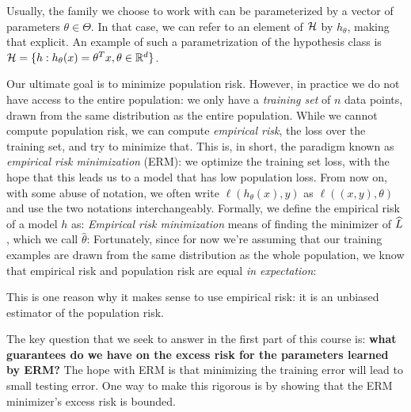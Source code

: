 Usually, the family we choose to work with can be parameterized by a vector of parameters $\theta \in \Theta$. In that case, we can refer to an element of $\mathcal H$ by $h_\theta$, making that explicit. An example of such a parametrization of the hypothesis class is $\mathcal H = \{ h: h_\theta(x) = \theta^Tx, \theta \in \mathbb{R}^d \}$.


Our ultimate goal is to minimize population risk. However, in practice we do not have access to the entire population: we only have a \emph{training set} of $n$ data points, drawn from the same distribution as the entire population. While we cannot compute population risk, we can compute \emph{empirical risk}, the loss over the training set, and try to minimize that. This is, in short, the paradigm known as \emph{empirical risk minimization} (ERM): we optimize the training set loss, with the hope that this leads us to a model that has low
population loss. From now on, with some abuse of notation, we often write $\ell(h_\theta(x),y)$ as $\ell((x,y),\theta)$ and use the two notations interchangeably.  Formally, we define the empirical risk of a model $h$ as:
\emph{Empirical risk minimization} means of finding the minimizer of $\widehat{L}$, which we call $\hat{\theta}$:
Fortunately, since for now we're assuming that our training examples are drawn from the same distribution as the whole population, we know that empirical risk and population risk are equal
\emph{in expectation}:


This is one reason why it makes sense to use empirical risk: it is an unbiased estimator of the population risk.

The key question that we seek to answer in the first part of this course is: \textbf{what guarantees do we have on the excess risk for the parameters learned by ERM?} The hope with ERM is that minimizing the training error will lead to small testing error. One way to make this rigorous is by showing that the ERM minimizer's excess risk is bounded.

